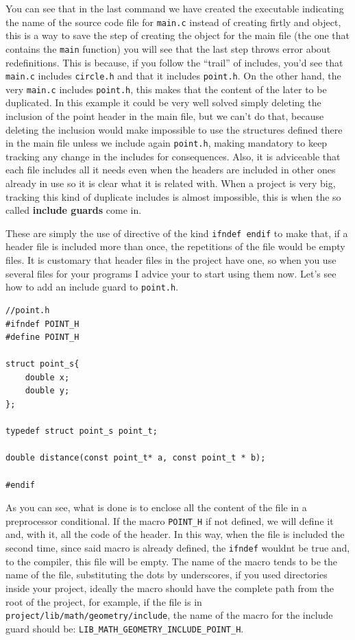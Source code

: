 \documentclass[a4paper]{article}
\begin{document}
You can see that in the last command we have created the executable indicating
the name of the source code file for \verb!main.c! instead of creating firtly
and object, this is a way to save the step of creating the object for the main
file (the one that contains the \verb!main! function) you will see that the last
step throws error about redefinitions. This is because, if you follow the
``trail'' of includes, you'd see that \verb!main.c! includes \verb!circle.h! and
that it includes \verb!point.h!. On the other hand, the very \verb!main.c!
includes \verb!point.h!, this makes that the content of the later to be
duplicated. In this example it could be very well solved simply deleting the
inclusion of the point header in the main file, but we can't do that, because
deleting the inclusion would make impossible to use the structures defined there
in the main file unless we include again \verb!point.h!, making mandatory to
keep tracking any change in the includes for consequences. Also, it is
adviceable that each file includes all it needs even when the headers are
included in other ones already in use so it is clear what it is related with.
When a project is very big, tracking this kind of duplicate includes is almost
impossible, this is when the so called \textbf{include guards} come in.

These are simply the use of directive of the kind \verb!ifndef endif! to make
that, if a header file is included more than once, the repetitions of the file
would be empty files. It is customary that header files in the project have one,
so when you use several files for your programs I advice your to start using
them now. Let's see how to add an include guard to \verb!point.h!.

\noindent
\begin{minipage}[H]{\linewidth}
\mbox{}
\begin{lstlisting}[style=C,
caption={Example of include guard},
label={lst:includeGuard}]
//point.h
#ifndef POINT_H
#define POINT_H

struct point_s{
    double x;
    double y;
};

typedef struct point_s point_t;

double distance(const point_t* a, const point_t * b);

#endif
\end{lstlisting}
\end{minipage}

As you can see, what is done is to enclose all the content of the file in a
preprocessor conditional. If the macro \verb!POINT_H! if not defined, we will
define it and, with it, all the code of the header. In this way, when the file
is included the second time, since said macro is already defined, the
\verb!ifndef! wouldnt be true and, to the compiler, this file will be empty.
The name of the macro tends to be the name of the file, substituting the dots
by underscores, if you used directories inside your project, ideally the macro
should have the complete path from the root of the project, for example, if the
file is in \verb!project/lib/math/geometry/include!, the name of the macro for
the include guard should be: \verb!LIB_MATH_GEOMETRY_INCLUDE_POINT_H!.
\end{document}
